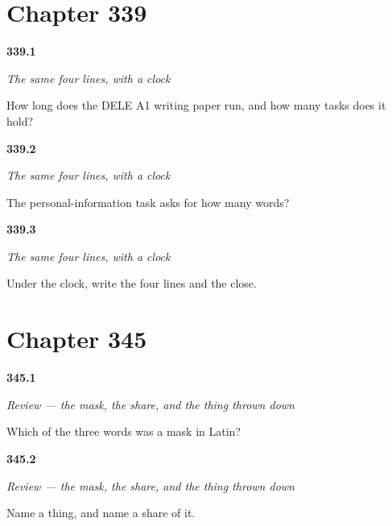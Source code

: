 \section*{Chapter 339}

\noindent\begin{minipage}[t]{\linewidth}
\raggedright
\hypertarget{review-ES-W01-con-reloj-clock}{\textbf{339.1}} \emph{The same four lines, with a clock}\par
\small How long does the DELE A1 writing paper run, and how many tasks does it hold?
\end{minipage}\par\medskip

\noindent\begin{minipage}[t]{\linewidth}
\raggedright
\hypertarget{review-ES-W01-con-reloj-length}{\textbf{339.2}} \emph{The same four lines, with a clock}\par
\small The personal-information task asks for how many words?
\end{minipage}\par\medskip

\noindent\begin{minipage}[t]{\linewidth}
\raggedright
\hypertarget{review-ES-W01-con-reloj-criteria}{\textbf{339.3}} \emph{The same four lines, with a clock}\par
\small Under the clock, write the four lines and the close.
\end{minipage}\par\medskip

\section*{Chapter 345}

\noindent\begin{minipage}[t]{\linewidth}
\raggedright
\hypertarget{review-ES-C345-repaso-persona-objeto-mask}{\textbf{345.1}} \emph{Review — the mask, the share, and the thing thrown down}\par
\small Which of the three words was a mask in Latin?
\end{minipage}\par\medskip

\noindent\begin{minipage}[t]{\linewidth}
\raggedright
\hypertarget{review-ES-C345-repaso-persona-objeto-grammar}{\textbf{345.2}} \emph{Review — the mask, the share, and the thing thrown down}\par
\small Name a thing, and name a share of it.
\end{minipage}\par\medskip

